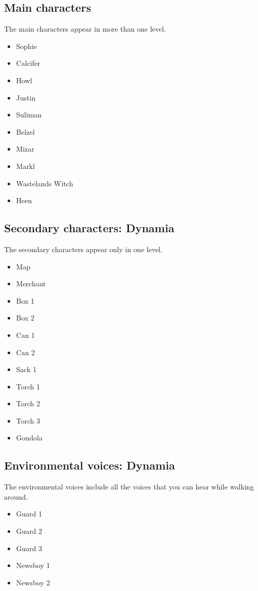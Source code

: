 \subsection{Main characters}
The main characters appear in more than one level.
\begin{itemize}
	\item Sophie
	\item Calcifer
	\item Howl
	\item Justin
	\item Suliman
	\item Belzel
	\item Mizar
	\item Markl
	\item Wastelands Witch
	\item Heen
\end{itemize}

\subsection{Secondary characters: Dynamia}
The secondary characters appear only in one level.
\begin{itemize}
	\item Map
	\item Merchant
	\item Box 1
	\item Box 2
	\item Can 1
	\item Can 2
	\item Sack 1
	\item Torch 1
	\item Torch 2
	\item Torch 3
	\item Gondola
\end{itemize}

\subsection{Environmental voices: Dynamia}
The environmental voices include all the voices that you can hear while walking around.
\begin{itemize}
	\item Guard 1
	\item Guard 2
	\item Guard 3
	\item Newsboy 1
	\item Newsboy 2
\end{itemize}
